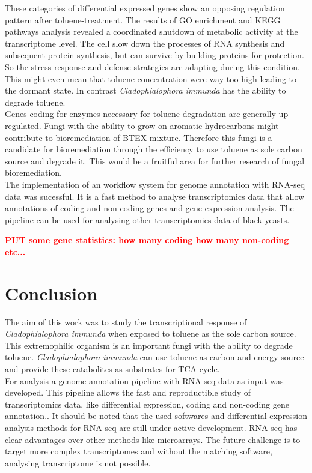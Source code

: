 \documentclass[12pt, a4paper]{report}
\newcommand{\HT}[1]{\textcolor{red}\textbf{#1}}
\begin{document}
These categories of differential expressed genes show an opposing regulation pattern after toluene-treatment. The results of GO enrichment and KEGG pathways analysis revealed a coordinated shutdown of metabolic activity at the transcriptome level. The cell slow down the processes of RNA synthesis and subsequent protein synthesis, but can survive by building proteins for protection. 
So the stress response and defense strategies are adapting during this condition. This might even mean that toluene concentration were way too high leading to the dormant state. In contrast \textit{Cladophialophora immunda} has the ability to degrade toluene. \\
Genes coding for enzymes necessary for toluene degradation are generally up-regulated. Fungi with the ability to grow on aromatic hydrocarbons might contribute to bioremediation of BTEX mixture. Therefore this fungi is a candidate for bioremediation through the efficiency to use toluene as sole carbon source and degrade it. This would be a fruitful area for further research of fungal bioremediation. \\

The implementation of an workflow system for genome annotation with RNA-seq data was sucessful. It is a fast method to analyse transcriptomics data that allow annotations of coding and non-coding genes and gene expression analysis. The pipeline can be used for analysing other transcriptomics data of black yeasts. 

\HT{PUT some gene statistics: how many coding how many non-coding etc...}

\newpage
\chapter*{Conclusion}
The aim of this work was to study the transcriptional response of \textit{Cladophialophora immunda} when exposed to toluene as the sole carbon source. This extremophilic organism is an important fungi with the ability to degrade toluene. \textit{Cladophialophora immunda} can use toluene as carbon and energy source  and provide these catabolites as substrates for TCA cycle. \\

For analysis a genome annotation pipeline with RNA-seq data as input was developed. This pipeline allows the fast and reproductible study of transcriptomics data, like differential expression, coding and non-coding gene annotation.. It should be noted that the used softwares and differential expression analysis methods for RNA-seq are still under active development. RNA-seq has clear advantages over other methods like microarrays. The future challenge is to target more complex transcriptomes and without the matching software, analysing transcriptome is not possible. \\
 
\end{document}
